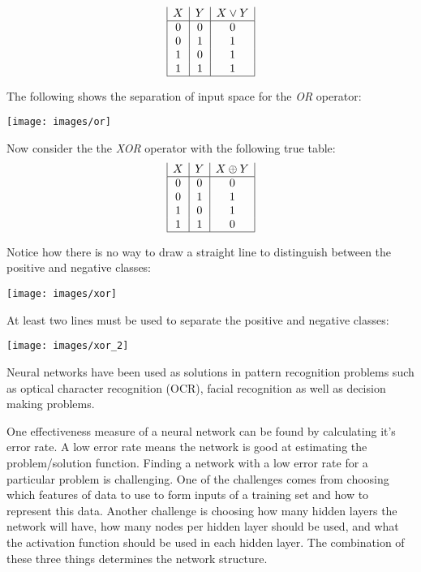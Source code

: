 \begin{displaymath}
\begin{array}{|c|c|c|}
   X
 & Y
 & X \lor Y
\\
\hline
0 & 0 & 0\\
0 & 1 & 1\\
1 & 0 & 1\\
1 & 1 & 1\\
\hline
\end{array}
\end{displaymath}

The following shows the separation of input space for the {\it OR} operator:

\texttt{[image: images/or]}

Now consider the the {\it XOR} operator with the following true table:
\begin{displaymath}
\begin{array}{|c|c|c|}
   X
 & Y
 & X \oplus Y
\\
\hline
0 & 0 & 0\\
0 & 1 & 1\\
1 & 0 & 1\\
1 & 1 & 0\\
\hline
\end{array}
\end{displaymath}

Notice how there is no way to draw a straight line to distinguish between the positive and negative classes:

\texttt{[image: images/xor]}

At least two lines must be used to separate the positive and negative classes:

\texttt{[image: images/xor\_2]}


Neural networks have been used as solutions in pattern recognition problems such as optical character recognition (OCR)\cite{ocr1,ocr2}, facial recognition\cite{face} as well as decision making problems\cite{decisionMaking1,decisionMaking2}.

One effectiveness measure of a neural network can be found by calculating it's error rate. A low error rate means the network is good at estimating the problem/solution function. Finding a network with a low error rate for a particular problem is challenging. One of the challenges comes from choosing which features of data to use to form inputs of a training set and how to represent this data. Another challenge is choosing how many hidden layers the network will have, how many nodes per hidden layer should be used, and what the activation function should be used in each hidden layer. The combination of these three things determines the network structure. 



